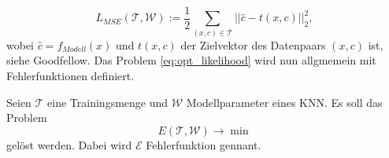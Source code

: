 \begin{equation*}
    \label{eq:MSE_1}
    L_{MSE}(\mathcal{T},\mathcal{W}):=\frac{1}{2} \sum_{(x,c) \in \mathcal{T}} ||\hat{c}-t(x,c)||_2^2,
\end{equation*}
wobei $\hat{c}=f_{Modell}(x)$ und $t(x,c)$ der Zielvektor des Datenpaars $(x,c)$ ist, siehe Goodfellow\cite{Goodfellow-et-al-2016}. 
Das Problem \ref{eq:opt_likelihood} wird nun allgmemein mit Fehlerfunktionen definiert.
 \begin{defi}[Fehlerfunktion]
    Seien $\mathcal{T}$ eine Trainingsmenge und $\mathcal{W}$ Modellparameter eines KNN. Es soll das Problem
    \begin{equation}
        \label{eq:error_fun_opt}
        E(\mathcal{T},\mathcal{W}) \rightarrow \min
    \end{equation}
    gelöst werden. Dabei wird $\mathcal{E}$ Fehlerfunktion gennant.
 \end{defi}


